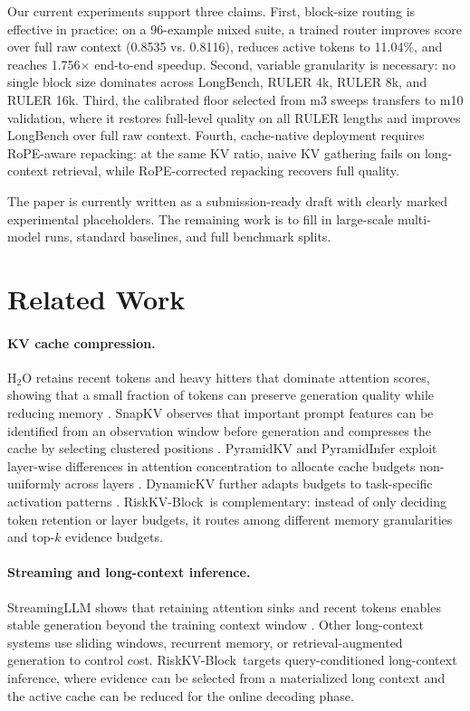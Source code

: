 \documentclass{article}
\newcommand{\method}{RiskKV-Block}
\begin{document}
Our current experiments support three claims.
First, block-size routing is effective in practice: on a 96-example mixed suite, a trained router improves score over full raw context (0.8535 vs. 0.8116), reduces active tokens to 11.04\%, and reaches 1.756$\times$ end-to-end speedup.
Second, variable granularity is necessary: no single block size dominates across LongBench, RULER 4k, RULER 8k, and RULER 16k.
Third, the calibrated floor selected from m3 sweeps transfers to m10 validation, where it restores full-level quality on all RULER lengths and improves LongBench over full raw context.
Fourth, cache-native deployment requires RoPE-aware repacking: at the same KV ratio, naive KV gathering fails on long-context retrieval, while RoPE-corrected repacking recovers full quality.

The paper is currently written as a submission-ready draft with clearly marked experimental placeholders.
The remaining work is to fill in large-scale multi-model runs, standard baselines, and full benchmark splits.

\section{Related Work}

\paragraph{KV cache compression.}
H$_2$O retains recent tokens and heavy hitters that dominate attention scores, showing that a small fraction of tokens can preserve generation quality while reducing memory \citep{zhang2023h2o}.
SnapKV observes that important prompt features can be identified from an observation window before generation and compresses the cache by selecting clustered positions \citep{li2024snapkv}.
PyramidKV and PyramidInfer exploit layer-wise differences in attention concentration to allocate cache budgets non-uniformly across layers \citep{cai2024pyramidkv,yang2024pyramidinfer}.
DynamicKV further adapts budgets to task-specific activation patterns \citep{zhou2024dynamickv}.
\method\ is complementary: instead of only deciding token retention or layer budgets, it routes among different memory granularities and top-$k$ evidence budgets.

\paragraph{Streaming and long-context inference.}
StreamingLLM shows that retaining attention sinks and recent tokens enables stable generation beyond the training context window \citep{xiao2023streamingllm}.
Other long-context systems use sliding windows, recurrent memory, or retrieval-augmented generation to control cost.
\method\ targets query-conditioned long-context inference, where evidence can be selected from a materialized long context and the active cache can be reduced for the online decoding phase.
\end{document}
